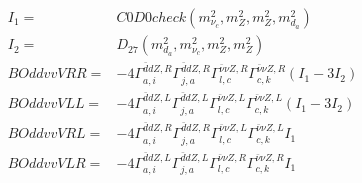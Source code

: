 \documentclass[A4,landscape]{article}
\begin{document}
\begin{align} 
I_1 = & C0D0check(m^2_{\nu_{{c}}}, m^2_{Z}, m^2_{Z}, m^2_{d_{{a}}}) \\ 
I_2 = & D_{27}(m^2_{d_{{a}}}, m^2_{\nu_{{c}}}, m^2_{Z}, m^2_{Z}) \\ 
  BOddvvVRR= & -4  \Gamma^{\bar{d}d Z ,R}_{a, i} \Gamma^{\bar{d}d Z ,R}_{j, a} \Gamma^{\bar{\nu}\nu Z ,R}_{l, c} \Gamma^{\bar{\nu}\nu Z ,R}_{c, k} (I_1 - 3 I_2) \\ 
  BOddvvVLL= & -4  \Gamma^{\bar{d}d Z ,L}_{a, i} \Gamma^{\bar{d}d Z ,L}_{j, a} \Gamma^{\bar{\nu}\nu Z ,L}_{l, c} \Gamma^{\bar{\nu}\nu Z ,L}_{c, k} (I_1 - 3 I_2) \\ 
  BOddvvVRL= & -4  \Gamma^{\bar{d}d Z ,R}_{a, i} \Gamma^{\bar{d}d Z ,R}_{j, a} \Gamma^{\bar{\nu}\nu Z ,L}_{l, c} \Gamma^{\bar{\nu}\nu Z ,L}_{c, k} I_1 \\ 
  BOddvvVLR= & -4  \Gamma^{\bar{d}d Z ,L}_{a, i} \Gamma^{\bar{d}d Z ,L}_{j, a} \Gamma^{\bar{\nu}\nu Z ,R}_{l, c} \Gamma^{\bar{\nu}\nu Z ,R}_{c, k} I_1 \\ 
\end{align} 
\end{document}
